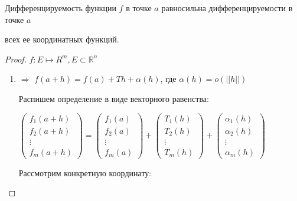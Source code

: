 \begin{theorem} \thmslashn

    Дифференцируемость функции $f$ в точке $a$ равносильна дифференцируемости в точке $a$

    всех ее координатных функций.

    \begin{proof} \thmslashn
        
        $f: E \mapsto R^m, E \subset \mathbb{R}^n$

        \begin{enumerate}
            \item $\Rightarrow$
                $f(a + h) = f(a) + Th + \alpha(h)$, где $\alpha(h) = o(||h||)$

                Распишем определение в виде векторного равенства:

                $
                \begin{pmatrix}
                    f_1(a + h)\\
                    f_2(a + h)\\
                    \vdots\\
                    f_m(a + h)
                \end{pmatrix} = 
                \begin{pmatrix}
                    f_1(a)\\
                    f_2(a)\\
                    \vdots\\
                    f_m(a)
                \end{pmatrix} +
                \begin{pmatrix}
                    T_1(h)\\
                    T_2(h)\\
                    \vdots\\
                    T_m(h)
                \end{pmatrix} +
                \begin{pmatrix}
                    \alpha_1(h)\\
                    \alpha_2(h)\\
                    \vdots\\
                    \alpha_m(h)
                \end{pmatrix}  
                $
                
                Рассмотрим конкретную координату:    


\end{enumerate}
\end{proof}
\end{theorem}
